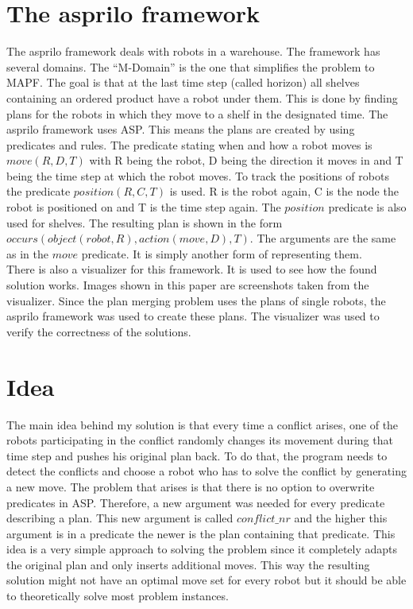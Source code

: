\documentclass[runningheads]{llncs}
\begin{document}
\section{The asprilo framework}
The asprilo framework deals with robots in a warehouse. The framework has several domains. The ``M-Domain'' is the one that simplifies the problem to MAPF. The goal is that at the last time step (called horizon) all shelves containing an ordered product have a robot under them. This is done by finding plans for the robots in which they move to a shelf in the designated time. The asprilo framework uses ASP. This means the plans are created by using predicates and rules. The predicate stating when and how a robot moves is $move(R,D,T)$ with R being the robot, D being the direction it moves in and T being the time step at which the robot moves. To track the positions of robots the predicate $position(R,C,T)$ is used. R is the robot again, C is the node the robot is positioned on and T is the time step again. The $position$ predicate is also used for shelves. The resulting plan is shown in the form $occurs(object(robot,R),action(move,D),T)$. The arguments are the same as in the $move$ predicate. It is simply another form of representing them. \\
There is also a visualizer for this framework. It is used to see how the found solution works. Images shown in this paper are screenshots taken from the visualizer.
Since the plan merging problem uses the plans of single robots, the asprilo framework was used to create these plans. The visualizer was used to verify the correctness of the solutions.


\section{Idea}
The main idea behind my solution is that every time a conflict arises, one of the robots participating in the conflict randomly changes its movement during that time step and pushes his original plan back. 
To do that, the program needs to detect the conflicts and choose a robot who has to solve the conflict by generating a new move. The problem that arises is that
there is no option to overwrite predicates in ASP. Therefore, a new argument was needed for every predicate describing a plan. This new argument is called $conflict\_nr$ and 
the higher this argument is in a predicate the newer is the plan containing that predicate. This idea is a very simple approach to solving the problem since it completely adapts the original plan and only
inserts additional moves. This way the resulting solution might not have an optimal move set for every robot but it should be able to theoretically solve most problem instances. 
\end{document}
